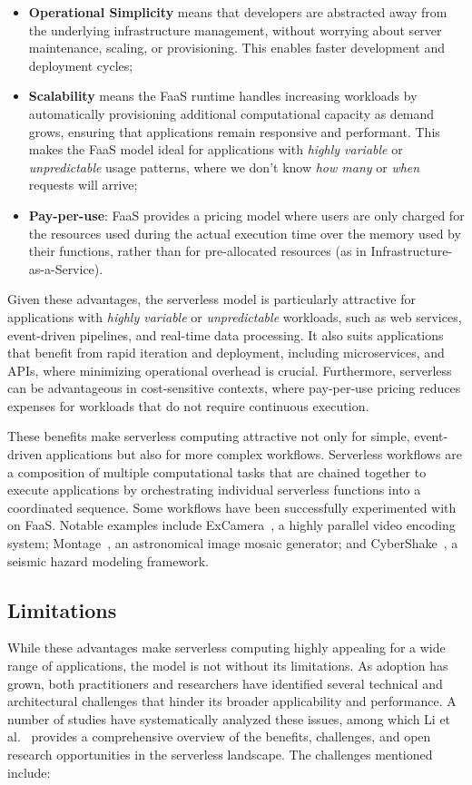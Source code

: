 \begin{itemize}
    \item{\textbf{Operational Simplicity} means that developers are abstracted away from the underlying infrastructure management, without worrying about server maintenance, scaling, or provisioning. This enables faster development and deployment cycles;}
    \item{\textbf{Scalability} means the FaaS runtime handles increasing workloads by automatically provisioning additional computational capacity as demand grows, ensuring that applications remain responsive and performant. This makes the FaaS model ideal for applications with \textit{highly variable} or \textit{unpredictable} usage patterns, where we don't know \textit{how many} or \textit{when} requests will arrive;}
    \item{\textbf{Pay-per-use}: FaaS provides a pricing model where users are only charged for the resources used during the actual execution time over the memory used by their functions, rather than for pre-allocated resources (as in Infrastructure-as-a-Service).}
\end{itemize}

Given these advantages, the serverless model is particularly attractive for applications with \textit{highly variable} or \textit{unpredictable} workloads, such as web services, event-driven pipelines, and real-time data processing. It also suits applications that benefit from rapid iteration and deployment, including microservices, and APIs, where minimizing operational overhead is crucial. Furthermore, serverless can be advantageous in cost-sensitive contexts, where pay-per-use pricing reduces expenses for workloads that do not require continuous execution.

These benefits make serverless computing attractive not only for simple, event-driven applications but also for more complex workflows. Serverless workflows are a composition of multiple computational tasks that are chained together to execute applications by orchestrating individual serverless functions into a coordinated sequence. Some workflows have been successfully experimented with on FaaS. Notable examples include ExCamera~\cite{excamera}, a highly parallel video encoding system; Montage~\cite{montage_astronomy}, an astronomical image mosaic generator; and CyberShake~\cite{cybershake_workflow}, a seismic hazard modeling framework.

\subsection{Limitations}
While these advantages make serverless computing highly appealing for a wide range of applications, the model is not without its limitations. As adoption has grown, both practitioners and researchers have identified several technical and architectural challenges that hinder its broader applicability and performance. A number of studies have systematically analyzed these issues, among which Li et al.~\cite{serverless_computing_survey_rw1} provides a comprehensive overview of the benefits, challenges, and open research opportunities in the serverless landscape. The challenges mentioned include:

